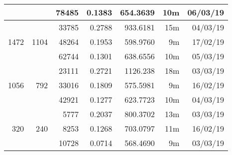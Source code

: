 \begin{center}
\begin{tabular}{ r r r | r | r r r }
  & & 78485 & 0.1383 & 654.3639 & 10m & 06/03/19 \\
  \hline
  \multirow{3}{*}{1472} & \multirow{3}{*}{1104} & 33785 & 0.2788 & 933.6181 & 15m & 04/03/19 \\
  & & 48264 & 0.1953 & 598.9760 & 9m & 17/02/19 \\
  & & 62744 & 0.1301 & 638.6556 & 10m & 05/03/19 \\
  \hline
  \multirow{3}{*}{1056} & \multirow{3}{*}{792} & 23111 & 0.2721 & 1126.238 & 18m & 03/03/19 \\
  & & 33016 & 0.1809 & 575.5981 & 9m & 16/02/19 \\
  & & 42921 & 0.1277 & 623.7723 & 10m & 04/03/19 \\
  \hline
  \multirow{3}{*}{320} & \multirow{3}{*}{240} & 5777 & 0.2037 & 800.3702 & 13m & 03/03/19 \\
  & & 8253 & 0.1268 & 703.0797 & 11m & 16/02/19 \\
  & & 10728 & 0.0714 & 568.4690 & 9m & 03/03/19 \\
  \end{tabular}
  \end{center}